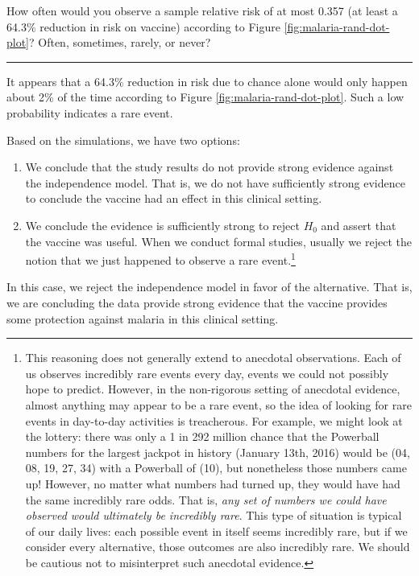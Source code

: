 \documentclass[
  10pt,
  openany]{book}
\theoremstyle{definition}
\theoremstyle{definition}
\theoremstyle{definition}
\theoremstyle{definition}
\theoremstyle{remark}
\begin{document}
How often would you observe a sample relative risk of at most 0.357 (at least a 64.3\% reduction in risk on vaccine) according to Figure \ref{fig:malaria-rand-dot-plot}? Often, sometimes, rarely, or never?

\begin{center}\rule{0.5\linewidth}{0.5pt}\end{center}

It appears that a 64.3\% reduction in risk due to chance alone would only happen about 2\% of the time according to Figure \ref{fig:malaria-rand-dot-plot}. Such a low probability indicates a rare event.

Based on the simulations, we have two options:

\begin{enumerate}
\def\labelenumi{\arabic{enumi}.}
\item
  We conclude that the study results do not provide strong evidence against the independence model. That is, we do not have sufficiently strong evidence to conclude the vaccine had an effect in this clinical setting.
\item
  We conclude the evidence is sufficiently strong to reject \(H_0\) and assert that the vaccine was useful. When we conduct formal studies, usually we reject the notion that we just happened to observe a rare event.\footnote{This reasoning does not generally extend to anecdotal observations. Each of us observes incredibly rare events every day, events we could not possibly hope to predict. However, in the non-rigorous setting of anecdotal evidence, almost anything may appear to be a rare event, so the idea of looking for rare events in day-to-day activities is treacherous. For example, we might look at the lottery: there was only a 1 in 292 million chance that the Powerball numbers for the largest jackpot in history (January 13th, 2016) would be (04, 08, 19, 27, 34) with a Powerball of (10), but nonetheless those numbers came up! However, no matter what numbers had turned up, they would have had the same incredibly rare odds. That is, \emph{any set of numbers we could have observed would ultimately be incredibly rare}. This type of situation is typical of our daily lives: each possible event in itself seems incredibly rare, but if we consider every alternative, those outcomes are also incredibly rare. We should be cautious not to misinterpret such anecdotal evidence.}
\end{enumerate}

In this case, we reject the independence model in favor of the alternative. That is, we are concluding the data provide strong evidence that the vaccine provides some protection against malaria in this clinical setting.
\end{document}

